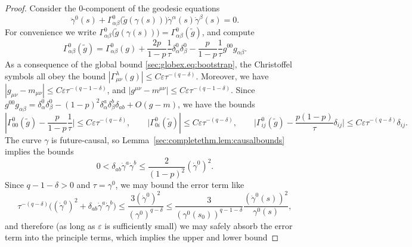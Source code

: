 \documentclass{article}
\newcommand{\wt}{\widetilde}
\newcommand{\ve}{\varepsilon}
\begin{document}
\begin{proof}
    Consider the $0$-component of the geodesic equations
    \begin{equation}\label{sec:completethm.eq:geodesicproof1}
        \ddot{\gamma}^0(s) + \Gamma_{\alpha\beta}^0\big(\wt{g}(\gamma(s))\big)\dot{\gamma}^\alpha(s)\dot{\gamma}^\beta(s) = 0.
    \end{equation}
    For convenience we write $\Gamma_{\alpha\beta}^0\big(\wt{g}(\gamma(s))\big) = \Gamma_{\alpha\beta}^0(\wt{g})$, and compute
    \begin{equation}
        \Gamma_{\alpha\beta}^0(\wt{g}) = \Gamma_{\alpha\beta}^0(g) + \frac{2p}{1-p}\frac{1}{\tau}\delta_\alpha^0\delta_\beta^0 - \frac{p}{1-p}\frac{1}{\tau}g^{00}g_{\alpha\beta}.
    \end{equation}
    As a consequence of the global bound \eqref{sec:globex.eq:bootstrap}, the Christoffel symbols all obey the bound $|\Gamma_{\mu\nu}^\lambda(g)| \leq C\ve \tau^{-(q-\delta)}$. Moreover, we have $|g_{\mu\nu} - m_{\mu\nu}| \leq C\ve \tau^{-(q-1-\delta)}$, and $|g^{\mu\nu} - m^{\mu\nu}| \leq C\ve \tau^{-(q-1-\delta)}$. Since $g^{00}g_{\alpha\beta} =\delta_\alpha^0 \delta_\beta^0 - (1-p)^2 \delta_\alpha^a\delta_\beta^b \delta_{ab} + O(g-m)$, we have the bounds
    \begin{equation}
        |\Gamma_{00}^0(\wt{g})- \frac{p}{1-p}\frac{1}{\tau}\big| \leq C\ve\tau^{-(q-\delta)},\qquad
        \big|\Gamma_{0i}^0(\wt{g})| \leq C\ve\tau^{-(q-\delta)},\qquad
    \big|\Gamma_{ij}^0(\wt{g}) - \frac{p(1-p)}{\tau}\delta_{ij}\big| \leq C\ve\tau^{-(q-\delta)}\delta_{ij}.
    \end{equation}
    The curve $\gamma$ is future-causal, so Lemma~\ref{sec:completethm.lem:causalbounds} implies the bounds
    \begin{equation}
        0 < \delta_{ab}\dot{\gamma}^a\dot{\gamma}^b \leq \frac{2}{(1-p)^2}(\dot{\gamma}^0)^2.
    \end{equation}
    Since $q-1-\delta > 0$ and $\tau = \gamma^0$, we may bound the error term like
    \begin{equation}
        \tau^{-(q-\delta)}\big((\dot{\gamma}^0)^2 + \delta_{ab}\dot{\gamma}^a\dot{\gamma}^b\big) \leq \frac{3(\dot{\gamma}^0)^2}{(\gamma^0)^{q-\delta}} \leq \frac{3}{(\gamma^0(s_0))^{q-1-\delta}}\frac{(\dot{\gamma}^0(s))^2}{\gamma^0(s)},
    \end{equation}
    and therefore (as long as $\ve$ is sufficiently small) we may safely absorb the error term into the principle terms, which implies the upper and lower bound

\end{proof}
\end{document}

